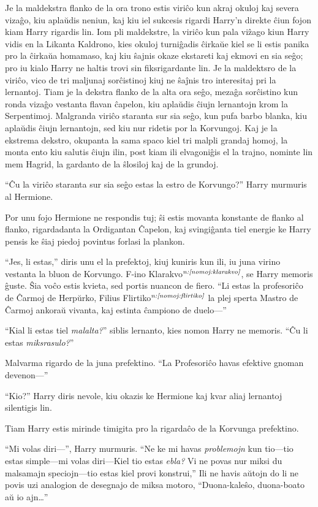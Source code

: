 Je la maldekstra flanko de la ora trono estis viriĉo kun akraj okuloj
kaj severa vizaĝo, kiu aplaŭdis neniun, kaj kiu iel sukcesis rigardi
Harry'n direkte ĉiun fojon kiam Harry rigardis lin. Iom pli
maldekstre, la viriĉo kun pala viẑago kiun Harry vidis en la Likanta
Kaldrono, kies okuloj turniĝadis ĉirkaŭe kiel se li estis panika pro
la ĉirkaŭa homamaso, kaj kiu ŝajnis okaze ekstareti kaj ekmovi en sia
seĝo; pro iu kialo Harry ne haltis trovi sin fiksrigardante lin.  Je
la maldektsro de la viriĉo, vico de tri maljunaj sorĉistinoj kiuj ne
ŝaĵnis tro interesitaj pri la lernantoj. Tiam je la dekstra flanko de
la alta ora seĝo, mezaĝa sorĉistino kun ronda vizaĝo vestanta flavan
ĉapelon, kiu aplaŭdis ĉiujn lernantojn krom la Serpentimoj. Malgranda
viriĉo staranta sur sia seĝo, kun pufa barbo blanka, kiu aplaŭdis
ĉiujn lernantojn, sed kiu nur ridetis por la Korvungoj. Kaj je la
ekstrema dekstro, okupanta la sama spaco kiel tri malpli grandaj
homoj, la monta ento kiu salutis ĉiujn ilin, post kiam ili elvagoniĝis
el la trajno, nominte lin mem Hagrid, la gardanto de la ŝlosiloj kaj
de la grundoj.

``Ĉu la viriĉo staranta sur sia seĝo estas la estro de Korvungo?''
Harry murmuris al Hermione.

Por unu fojo Hermione ne respondis tuj; ŝi estis movanta konstante de
flanko al flanko, rigardadanta la Ordigantan Ĉapelon, kaj svingiĝanta
tiel energie ke Harry pensis ke ŝiaj piedoj povintus forlasi la
plankon.

``Jes, li estas,'' diris unu el la prefektoj, kiuj kuniris kun ili, iu
juna virino vestanta la bluon de Korvungo. F-ino
Klarakvo$^{\textit{n:\ref{nomoj:klarakvo}}}$, se Harry memoris ĝuste. Ŝia voĉo
estis kvieta, sed portis nuancon de fiero. ``Li estas la profesoriĉo
de Ĉarmoj de Herpŭrko, Filius Flirtiko$^{\textit{n:\ref{nomoj:flirtiko}}}$ la plej
sperta Mastro de Ĉarmoj ankoraŭ vivanta, kaj estinta ĉampiono de
duelo—''

``Kial li estas tiel \emph{malalta?}'' siblis lernanto, kies nomon
Harry ne memoris. ``Ĉu li estas \emph{miksrasulo?}''

Malvarma rigardo de la juna prefektino. ``La Profesoriĉo havas
efektive gnoman devenon—''

``Kio?'' Harry diris nevole, kiu okazis ke Hermione kaj kvar aliaj
lernantoj silentigis lin.

Tiam Harry estis mirinde timigita pro la rigardaĉo de la Korvunga
prefektino.

``Mi volas diri—'', Harry murmuris. ``Ne ke mi havas \emph{problemojn}
kun tio—tio estas simple—mi volas diri—Kiel tio estas \emph{ebla?} Vi
ne povas nur miksi du malsamajn speciojn—tio estas kiel provi
konstrui,'' Ili ne havis aŭtojn do li ne povis uzi analogion de
desegnajo de miksa motoro, ``Duona-kaleŝo, duona-boato aŭ io
ajn\ldots''

